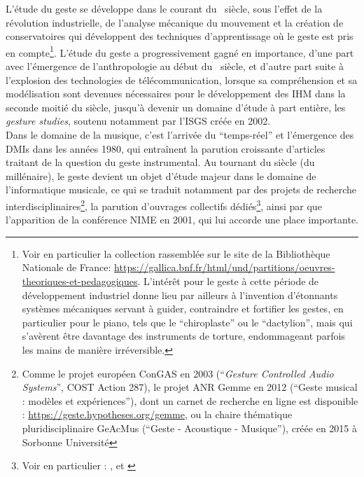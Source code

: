 \indent L'étude du geste se développe dans le courant du ~siècle, sous l'effet de la révolution industrielle, de l'analyse mécanique du mouvement et la création de conservatoires qui développent des techniques d'apprentissage où le geste est pris en compte\footnote{Voir en particulier la collection rassemblée sur le site de la Bibliothèque Nationale de France: \url{https://gallica.bnf.fr/html/und/partitions/oeuvres-theoriques-et-pedagogiques}. L'intérêt pour le geste à cette période de développement industriel donne lieu par ailleurs à l'invention d'étonnants systèmes mécaniques servant à guider, contraindre et fortifier les gestes, en particulier pour le piano, tels que le ``chiroplaste'' ou le ``dactylion'', mais qui s'avèrent être davantage des instruments de torture, endommageant parfois les mains de manière irréversible.}. L'étude du geste a progressivement gagné en importance, d'une part avec l'émergence de l'anthropologie au début du ~siècle, et d'autre part suite à l'explosion des technologies de télécommunication, lorsque sa compréhension et sa modélisation sont devenues nécessaires pour le développement des \gls{IHM} dans la seconde moitié du siècle, jusqu'à devenir un domaine d'étude à part entière, les \textit{gesture studies}, soutenu notamment par l'\gls{ISGS} créée en 2002.\\
\indent Dans le domaine de la musique, c'est l'arrivée du ``temps-réel'' et l'émergence des \glspl{DMI} dans les années 1980, qui entraînent la parution croissante d'articles traitant de la question du geste instrumental. Au tournant du siècle (du millénaire), le geste devient un objet d'étude majeur dans le domaine de l'informatique musicale, ce qui se traduit notamment par 
des projets de recherche interdisciplinaires\footnote{Comme le projet européen ConGAS en 2003 (``\textit{Gesture Controlled Audio Systems}'', COST Action 287), le projet ANR Gemme en 2012 (``Geste musical : modèles et expériences''), dont un carnet de recherche en ligne est disponible : \url{https://geste.hypotheses.org/gemme}, ou la chaire thématique pluridisciplinaire GeAcMus (``Geste - Acoustique - Musique''), créée en 2015 à Sorbonne Université}, la parution d'ouvrages collectifs dédiés\footnote{Voir en particulier : \cite{genevois_les_1999}, \cite{wanderley_trends_2000} et \cite{godoy_musical_2010}}, ainsi par que l'apparition de la conférence \gls{NIME} en 2001, qui lui accorde une place importante.\\



